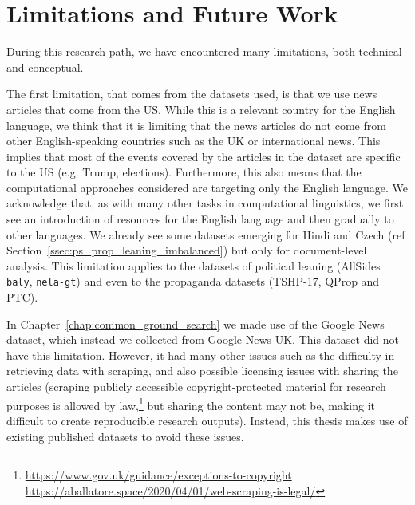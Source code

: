 \section{\statusgreen Limitations and Future Work}
\label{sec:discussion_limitations}

During this research path, we have encountered many limitations, both technical and conceptual.


The first limitation, that comes from the datasets used, is that we use news articles that come from the US. While this is a relevant country for the English language, we think that it is limiting that the news articles do not come from other English-speaking countries %
such as the UK or international news.
This implies that most of the events covered by the articles in the dataset are specific to the US (e.g. Trump, elections).
Furthermore, this also means that the computational approaches considered are targeting only the English language. %
We acknowledge that, as with many other tasks in computational linguistics, we first see an introduction of resources for the English language and then gradually to other languages.
We already see some datasets emerging for Hindi and Czech (ref Section~\ref{ssec:ps_prop_leaning_imbalanced}) but only for document-level analysis.
This limitation applies to the datasets of political leaning (AllSides \texttt{baly}, \texttt{nela-gt}) and even to the propaganda datasets (TSHP-17, QProp and PTC). 

In Chapter~\ref{chap:common_ground_search} we made use of the Google News dataset, which instead we collected from Google News UK. This dataset did not have this limitation.
However, it had many other issues such as the difficulty in retrieving data with scraping, and also possible licensing issues with sharing the articles (scraping publicly accessible copyright-protected material for research purposes is allowed by law,\footnote{\url{https://www.gov.uk/guidance/exceptions-to-copyright} \\ \url{https://aballatore.space/2020/04/01/web-scraping-is-legal/}} but sharing the content may not be, making it difficult to create reproducible research outputs).
Instead, this thesis makes use of existing published datasets to avoid these issues.

